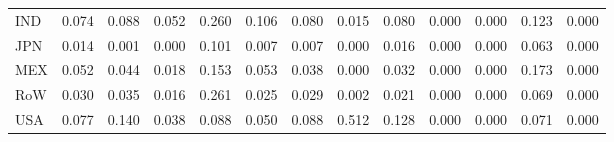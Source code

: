 \begin{table}[htbp]
\begin{tabular}{lcccccccccccc}
  IND & \textcolor[RGB]{57,37,198}{0.074} & \textcolor[RGB]{47,30,208}{0.088} & \textcolor[RGB]{72,47,183}{0.052} & \textcolor[RGB]{6,4,249}{0.260} & \textcolor[RGB]{32,21,223}{0.106} & \textcolor[RGB]{53,34,202}{0.080} & \textcolor[RGB]{128,82,128}{0.015} & \textcolor[RGB]{51,33,204}{0.080} & \textcolor[RGB]{255,165,0}{0.000} & \textcolor[RGB]{255,165,0}{0.000} & \textcolor[RGB]{23,15,232}{0.123} & \textcolor[RGB]{255,165,0}{0.000} \\ 
  JPN & \textcolor[RGB]{130,84,125}{0.014} & \textcolor[RGB]{155,100,100}{0.001} & \textcolor[RGB]{157,102,98}{0.000} & \textcolor[RGB]{38,25,217}{0.101} & \textcolor[RGB]{144,94,110}{0.007} & \textcolor[RGB]{147,95,108}{0.007} & \textcolor[RGB]{255,165,0}{0.000} & \textcolor[RGB]{123,80,132}{0.016} & \textcolor[RGB]{255,165,0}{0.000} & \textcolor[RGB]{255,165,0}{0.000} & \textcolor[RGB]{68,44,187}{0.063} & \textcolor[RGB]{255,165,0}{0.000} \\ 
  MEX & \textcolor[RGB]{74,48,181}{0.052} & \textcolor[RGB]{81,52,174}{0.044} & \textcolor[RGB]{119,77,136}{0.018} & \textcolor[RGB]{11,7,244}{0.153} & \textcolor[RGB]{70,45,185}{0.053} & \textcolor[RGB]{89,58,166}{0.038} & \textcolor[RGB]{255,165,0}{0.000} & \textcolor[RGB]{96,62,159}{0.032} & \textcolor[RGB]{255,165,0}{0.000} & \textcolor[RGB]{255,165,0}{0.000} & \textcolor[RGB]{8,5,246}{0.173} & \textcolor[RGB]{255,165,0}{0.000} \\ 
  RoW & \textcolor[RGB]{98,63,157}{0.030} & \textcolor[RGB]{94,61,162}{0.035} & \textcolor[RGB]{125,81,130}{0.016} & \textcolor[RGB]{4,3,251}{0.261} & \textcolor[RGB]{108,70,147}{0.025} & \textcolor[RGB]{100,65,155}{0.029} & \textcolor[RGB]{153,99,102}{0.002} & \textcolor[RGB]{115,74,140}{0.021} & \textcolor[RGB]{255,165,0}{0.000} & \textcolor[RGB]{255,165,0}{0.000} & \textcolor[RGB]{64,41,191}{0.069} & \textcolor[RGB]{255,165,0}{0.000} \\ 
  USA & \textcolor[RGB]{55,36,200}{0.077} & \textcolor[RGB]{15,10,240}{0.140} & \textcolor[RGB]{85,55,170}{0.038} & \textcolor[RGB]{49,32,206}{0.088} & \textcolor[RGB]{77,50,178}{0.050} & \textcolor[RGB]{45,29,210}{0.088} & \textcolor[RGB]{0,0,255}{0.512} & \textcolor[RGB]{19,12,236}{0.128} & \textcolor[RGB]{255,165,0}{0.000} & \textcolor[RGB]{255,165,0}{0.000} & \textcolor[RGB]{62,40,193}{0.071} & \textcolor[RGB]{255,165,0}{0.000} \\ 
   \hline
\end{tabular}
\end{table}
